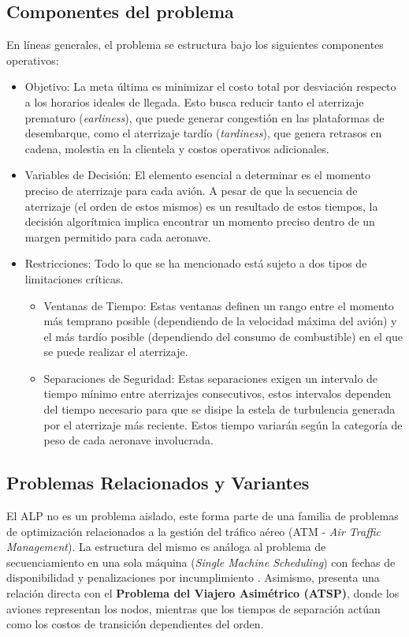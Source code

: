 \documentclass[letter, 10pt]{article}
\begin{document}
\subsection{Componentes del problema}
En l\'ineas generales, el problema se estructura bajo los siguientes componentes operativos:
\begin{itemize}
    \item Objetivo: La meta \'ultima es minimizar el costo total por desviaci\'on respecto a los horarios ideales de llegada. Esto busca reducir tanto el aterrizaje prematuro (\textit{earliness}), que puede generar congesti\'on en las plataformas de desembarque, como el aterrizaje tard\'io (\textit{tardiness}), que genera retrasos en cadena, molestia en la clientela y costos operativos adicionales. \cite{beasley2000}
    \item Variables de Decisi\'on: El elemento esencial a determinar es el momento preciso de aterrizaje para cada avi\'on. A pesar de que la secuencia de aterrizaje (el orden de estos mismos) es un resultado de estos tiempos, la decisi\'on algor\'itmica implica encontrar un momento preciso dentro de un margen permitido para cada aeronave.
    \item Restricciones: Todo lo que se ha mencionado est\'a sujeto a dos tipos de limitaciones cr\'iticas.
    \begin{itemize}
        \item Ventanas de Tiempo: Estas ventanas definen un rango entre el momento m\'as temprano posible (dependiendo de la velocidad m\'axima del avi\'on) y el m\'as tard\'io posible (dependiendo del consumo de combustible) en el que se puede realizar el aterrizaje.
        \item Separaciones de Seguridad: Estas separaciones exigen un intervalo de tiempo m\'inimo entre aterrizajes consecutivos, estos intervalos dependen del tiempo necesario para que se disipe la estela de turbulencia generada por el aterrizaje m\'as reciente. Estos tiempo variar\'an seg\'un la categor\'ia de peso de cada aeronave involucrada.
    \end{itemize}
\end{itemize}

\subsection{Problemas Relacionados y Variantes}
El ALP no es un problema aislado, este forma parte de una familia de problemas de optimizaci\'on relacionados a la gesti\'on del tr\'afico a\'ereo (ATM - \textit{Air Traffic Management}). La estructura del mismo es an\'aloga al problema de secuenciamiento en una sola m\'aquina (\textit{Single Machine Scheduling}) con fechas de disponibilidad y penalizaciones por incumplimiento\cite{beasley2000}
. Asimismo, presenta una relaci\'on directa con el \textbf{Problema del Viajero Asim\'etrico (ATSP)}, donde los aviones representan los nodos, mientras que los tiempos de separaci\'on act\'uan como los costos de transici\'on dependientes del orden. \cite{prakash2018}
\end{document}

